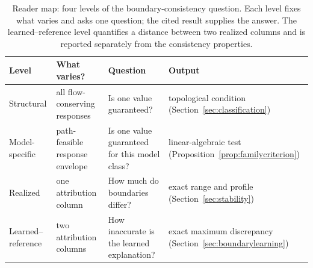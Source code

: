 \documentclass[a4paper,fleqn]{cas-sc}
\begin{document}
\begin{table}[pos=tb]
\footnotesize
\caption{Reader map: four levels of the boundary-consistency question.
Each level fixes what varies and asks one question; the cited result
supplies the answer. The learned--reference level quantifies a distance
between two realized columns and is reported separately from the
consistency properties.}
\label{tab:threequestions}
\begin{tabular*}{\tblwidth}{@{}p{3.0cm}p{3.9cm}p{4.3cm}p{3.3cm}@{}}
\toprule Level & What varies? & Question & Output\\\midrule
Structural & all flow-conserving responses & Is one value guaranteed? & topological condition (Section~\ref{sec:classification})\\
Model-specific & path-feasible response envelope & Is one value guaranteed for this model class? & linear-algebraic test (Proposition~\ref{prop:familycriterion})\\
Realized & one attribution column & How much do boundaries differ? & exact range and profile (Section~\ref{sec:stability})\\
Learned--reference & two attribution columns & How inaccurate is the learned explanation? & exact maximum discrepancy (Section~\ref{sec:boundarylearning})\\
\bottomrule\end{tabular*}\end{table}
\end{document}

